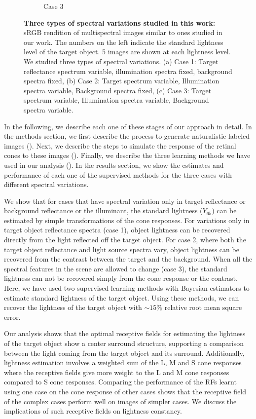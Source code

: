 \documentclass{jov}
\begin{document}
\begin{figure}
\begin{subfigure}[b]{0.33 \textwidth}
        \caption{Case 3}
        \label{fig:allSpectraVarying}
    \end{subfigure}    
    \caption{{\bf Three types of spectral variations studied in this work:} sRGB rendition of multispectral images similar to ones studied in our work. The numbers on the left indicate the standard lightness level of the target object. 5 images are shown at each lightness level. We studied three types of spectral variations. (a) Case 1: Target reflectance spectrum variable, illumination spectra fixed, background spectra fixed, (b) Case 2: Target spectrum variable, Illumination spectra variable, Background spectra fixed, (c) Case 3: Target spectrum variable, Illumination spectra variable, Background spectra variable.}
\label{fig:studiedCases}
\end{figure}

In the following, we describe each one of these stages of our approach in detail. In the methods section, we first describe the process to generate naturalistic labeled images (). Next, we describe the steps to simulate the response of the retinal cones to these images (). Finally, we describe the three learning methods we have used in our analysis (). In the results section, we show the estimates and performance of each one of the supervised methods for the three cases with different spectral variations. 

We show that for cases that have spectral variation only in target reflectance or background reflectance or the illuminant, the standard lightness ($Y_{65}$) can be estimated by simple transformations of the cone responses. For variations only in target object reflectance spectra (case 1), object lightness can be recovered directly from the light reflected off the target object. For case 2, where both the target object reflectance and light source spectra vary, object lightness can be recovered from the contrast between the target and the background. When all the spectral features in the scene are allowed to change (case 3), the standard lightness can not be recovered simply from the cone response or the contrast. Here, we have used two supervised learning methods with Bayesian estimators to estimate standard lightness of the target object. Using these methods, we can recover the lightness of the target object with $\sim 15\%$ relative root mean square error. 

Our analysis shows that the optimal receptive fields for estimating the lightness of the target object show a center surround structure, supporting a comparison between the light coming from the target object and its surround. Additionally, lightness estimation involves a weighted sum of the L, M and S cone responses where the receptive fields give more weight to the L and M cone responses compared to S cone responses. Comparing the performance of the RFs learnt using  one case on the cone response of other cases shows that the receptive field of the complex cases perform well on images of simpler cases. We discuss the implications of such receptive fields on lightness constancy. 
\end{document}
